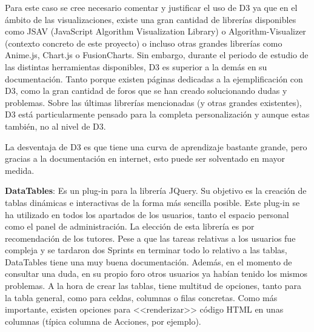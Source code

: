 Para este caso se cree necesario comentar y justificar el uso de D3 ya que en el
ámbito de las visualizaciones, existe una gran cantidad de librerías disponibles
como JSAV (JavaScript Algorithm Visualization Library) o Algorithm-Visualizer
(contexto concreto de este proyecto) o incluso otras grandes librerías como
Anime.js, Chart.js o FusionCharts. Sin embargo, durante el periodo de estudio de
las distintas herramientas disponibles, D3 es superior a la demás en su
documentación. Tanto porque existen páginas dedicadas a la ejemplificación con
D3, como la gran cantidad de foros que se han creado solucionando dudas y
problemas. Sobre las últimas librerías mencionadas (y otras grandes existentes),
D3 está particularmente pensado para la completa personalización y aunque estas
también, no al nivel de D3.

La desventaja de D3 es que tiene una curva de aprendizaje bastante grande, pero
gracias a la documentación en internet, esto puede ser solventado en mayor
medida.

\textbf{DataTables}: Es un plug-in para la librería JQuery. Su objetivo es la
creación de tablas dinámicas e interactivas de la forma más sencilla posible.
Este plug-in se ha utilizado en todos los apartados de los usuarios, tanto el
espacio personal como el panel de administración. La elección de esta librería
es por recomendación de los tutores. Pese a que las tareas relativas a los
usuarios fue compleja y se tardaron dos Sprints en terminar todo lo relativo a
las tablas, DataTables tiene una muy buena documentación. Además, en el momento
de consultar una duda, en su propio foro otros usuarios ya habían tenido los
mismos problemas. A la hora de crear las tablas, tiene multitud de opciones,
tanto para la tabla general, como para celdas, columnas o filas concretas. Como
más importante, existen opciones para <<renderizar>> código HTML en unas
columnas (típica columna de Acciones, por ejemplo).
